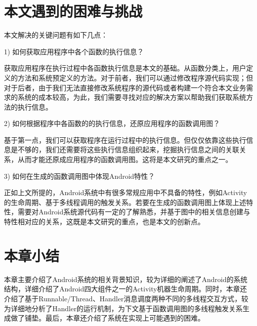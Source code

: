 \section{本文遇到的困难与挑战}


 本文解决的关键问题有如下几点：

1)	如何获取应用程序中各个函数的执行信息？

获取应用程序在执行过程中各函数执行信息是本文的基础。从函数分类上，用户定义的方法和系统预定义的方法。对于前者，我们可以通过修改程序源代码实现；但对于后者，由于我们无法直接修改系统程序的源代码或者构建一个符合本文业务需求的系统的成本较高，为此，我们需要寻找对应的解决方案以帮助我们获取系统方法的执行信息。

2)	如何根据程序中各函数的的执行信息，还原应用程序的函数调用图？

基于第一点，我们可以获取程序在运行过程中的执行信息。但仅仅依靠这些执行信息是不够的，我们还需要将这些执行信息组织起来，挖掘执行信息之间的关联关系，从而才能还原成应用程序的函数调用图。这将是本文研究的重点之一。

3)	如何在生成的函数调用图中体现Android特性？

正如上文所提的，Android系统中有很多常规应用中不具备的特性，例如Activity的生命周期、基于多线程调用的触发关系。若要在生成的函数调用图上体现上述特性，需要对Android系统源代码有一定的了解熟悉，并基于图中的相关信息创建与特性相对应的关系，这既是本文研究的重点，也是本文的创新点。

\section{本章小结}

本章主要介绍了Android系统的相关背景知识，较为详细的阐述了Android的系统结构，详细介绍了Android四大组件之一的Activity机器生命周期。同时，本章还介绍了基于Runnable/Thread、Handler消息调度两种不同的多线程交互方式，较为详细地分析了Handler的运行机制，为下文基于函数调用图的多线程触发关系生成做了铺垫。最后，本章还介绍了系统在实现上可能遇到的困难。
